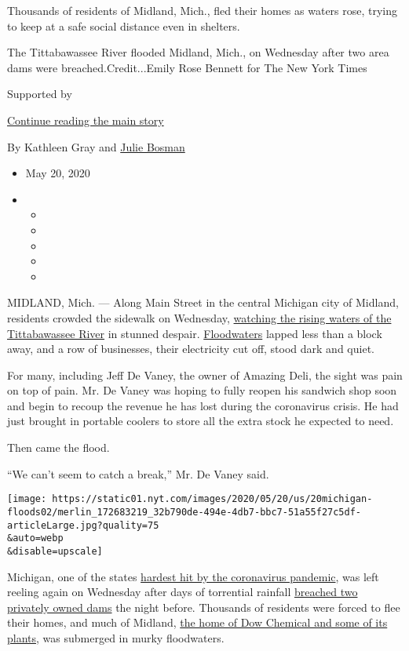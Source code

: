 Thousands of residents of Midland, Mich., fled their homes as waters
rose, trying to keep at a safe social distance even in shelters.

The Tittabawassee River flooded Midland, Mich., on Wednesday after two
area dams were breached.Credit...Emily Rose Bennett for The New York
Times

Supported by

\protect\hyperlink{after-sponsor}{Continue reading the main story}

By Kathleen Gray and
\href{https://www.nytimes.com/by/julie-bosman}{Julie Bosman}

\begin{itemize}
\item
  May 20, 2020
\item
  \begin{itemize}
  \item
  \item
  \item
  \item
  \item
  \end{itemize}
\end{itemize}

MIDLAND, Mich. --- Along Main Street in the central Michigan city of
Midland, residents crowded the sidewalk on Wednesday,
\href{https://www.nytimes.com/2020/05/20/us/michigan-dams.html}{watching
the rising waters of the Tittabawassee River} in stunned despair.
\href{https://www.nytimes.com/2020/07/03/world/asia/china-floods-rain.html}{Floodwaters}
lapped less than a block away, and a row of businesses, their
electricity cut off, stood dark and quiet.

For many, including Jeff De Vaney, the owner of Amazing Deli, the sight
was pain on top of pain. Mr. De Vaney was hoping to fully reopen his
sandwich shop soon and begin to recoup the revenue he has lost during
the coronavirus crisis. He had just brought in portable coolers to store
all the extra stock he expected to need.

Then came the flood.

``We can't seem to catch a break,'' Mr. De Vaney said.

\texttt{[image: https://static01.nyt.com/images/2020/05/20/us/20michigan-floods02/merlin\_172683219\_32b790de-494e-4db7-bbc7-51a55f27c5df-articleLarge.jpg?quality=75\\\&auto=webp\\\&disable=upscale]}

Michigan, one of the states
\href{https://www.nytimes.com/interactive/2020/us/michigan-coronavirus-cases.html}{hardest
hit by the coronavirus pandemic}, was left reeling again on Wednesday
after days of torrential rainfall
\href{https://www.nytimes.com/2020/05/19/us/michigan-dam-breach.html}{breached
two privately owned dams} the night before. Thousands of residents were
forced to flee their homes, and much of Midland,
\href{https://www.nytimes.com/2020/05/20/climate/michigan-dam-dow-chemical-superfund.html}{the
home of Dow Chemical and some of its plants}, was submerged in murky
floodwaters.

